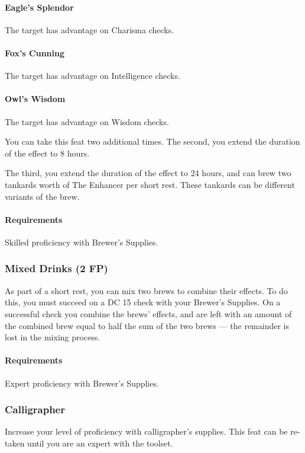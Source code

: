     \paragraph{Eagle's Splendor} The target has advantage on Charisma checks.
    \paragraph{Fox's Cunning} The target has advantage on Intelligence checks.
    \paragraph{Owl's Wisdom} The target has advantage on Wisdom checks.

    You can take this feat two additional times.
    The second, you extend the duration of the effect to 8 hours.

    The third, you extend the duration of the effect to 24 hours, and can brew two tankards worth of The Enhancer per short rest.
    These tankards can be different variants of the brew.
    \paragraph{Requirements} Skilled proficiency with Brewer's Supplies.
\subsubsection{Mixed Drinks (2 FP)} \label{feat::mixeddrinks}
    As part of a short rest, you can mix two brews to combine their effects.
    To do this, you must succeed on a DC 15 check with your Brewer's Supplies.
    On a successful check you combine the brews' effects, and are left with an amount of the combined brew equal to half the sum of the two brews --- the remainder is lost in the mixing process.
    \paragraph{Requirements} Expert proficiency with Brewer's Supplies.

\subsubsection{Calligrapher} \label{feat::calligrapher}
    Increase your level of proficiency with calligrapher's supplies.
    This feat can be re-taken until you are an expert with the toolset.

